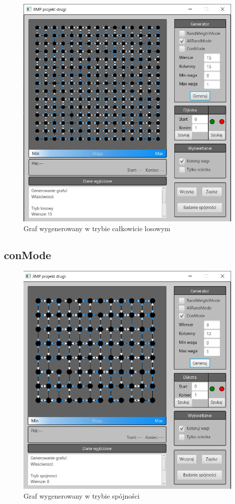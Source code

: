 \documentclass{article}
\begin{document}
 \begin{figure}[h]
\centering
\includegraphics[width=1\textwidth]{Screenshot_583.jpg}
\caption{\label{fig:mod}Graf wygenerowany w trybie całkowicie losowym}
\end{figure}
\pagebreak


\subsection{conMode}

\begin{figure}[h]
\centering
\includegraphics[width=1\textwidth]{Screenshot_584.jpg}
\caption{\label{fig:mod}Graf wygenerowany w trybie spójności}
\end{figure}
\pagebreak
\end{document}
